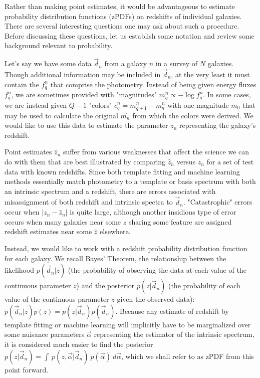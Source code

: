 \documentclass[12pt, onecolumn]{emulateapj}
\begin{document}
Rather than making point estimates, it would be advantageous to estimate probability distribution functions (zPDFs) on redshifts of individual galaxies.  There are several interesting questions one may ask about such a procedure.  Before discussing these questions, let us establish some notation and review some background relevant to probability.

Let's say we have some data $\vec{d}_{n}$ from a galaxy $n$ in a survey of $N$ galaxies.  Though additional information may be included in $\vec{d}_{n}$, at the very least it must contain the $f_{q}^{n}$ that comprise the photometry.  Instead of being given energy fluxes $f_{q}^{n}$, we are sometimes provided with "magnitudes" $m_{q}^{n}\propto -\log f_{q}^{n}$.  In some cases, we are instead given $Q-1$ "colors" $c_{q}^{n}=m_{q+1}^{n}-m_{q}^{n}$ with one magnitude $m_{0}$ that may be used to calculate the original $\vec{m}_{n}$ from which the colors were derived.  We would like to use this data to estimate the parameter $z_{n}$ representing the galaxy's redshift.  

Point estimates $\hat{z}_{n}$ suffer from various weaknesses that affect the science we can do with them that are best illustrated by comparing $\hat{z}_{n}$ versus $z_{n}$ for a set of test data with known redshifts.  Since both template fitting and machine learning methods essentially match photometry to a template or basis spectrum with both an intrinsic spectrum and a redshift, there are errors associated with misassignment of both redshift and intrinsic spectra to $\vec{d}_{n}$.  "Catastrophic" errors occur when $|z_{n}-\hat{z}_{n}|$ is quite large, although another insidious type of error occurs when many galaxies near some $z$ sharing some feature are assigned redshift estimates near some $\hat{z}$ elsewhere. 

Instead, we would like to work with a redshift probability distribution function for each galaxy.  We recall Bayes' Theorem, the relationship between the likelihood $p(\vec{d}_{n}|z)$ (the probability of observing the data at each value of the continuous parameter $z$) and the posterior $p(z|\vec{d}_{n})$ (the probability of each value of the continuous parameter $z$ given the observed data): $p(\vec{d}_{n}|z)p(z)=p(z|\vec{d}_{n})p(\vec{d}_{n})$.  Because any estimate of redshift by template fitting or machine learning will implicitly have to be marginalized over some nuisance parameters $\vec{\alpha}$ representing the estimator of the intrinsic spectrum, it is considered much easier to find the posterior $p(z|\vec{d}_{n})=\int\ p(z,\vec{\alpha}|\vec{d}_{n})\ p(\vec{\alpha})\ d\vec{\alpha}$, which we shall refer to as zPDF from this point forward.
\end{document}
